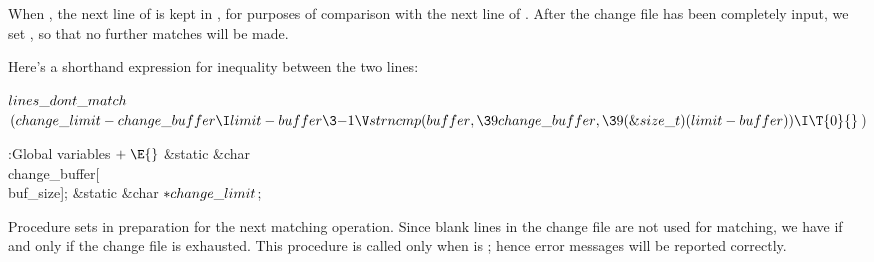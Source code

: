When , the next line of  is kept in
, for purposes of comparison with the next
line of . After the change file has been completely input, we
set ,
so that no further matches will be made.

Here's a shorthand expression for inequality between the two lines:

\Y\B\4\D$\\{lines\_dont\_match}$ \5
$(\\{change\_limit}-\\{change\_buffer}\I\\{limit}-\\{buffer}\3{-1}\V%
\\{strncmp}(\\{buffer},\39\\{change\_buffer},\39(\&{size\_t})(\\{limit}-%
\\{buffer}))\I\T{0}{}$)\par
\Y\B\4:Global variables\X${}\mathrel+\E{}$\6
\&{static} \&{char} \\{change\_buffer}[\\{buf\_size}];\6
\&{static} \&{char} ${}{*}\\{change\_limit}{}$;\par
\fi

Procedure 
sets  in preparation for the next matching operation.
Since blank lines in the change file are not used for matching, we have
 if and only if
the change file is exhausted. This procedure is called only when
 is ; hence error messages will be reported
correctly.

